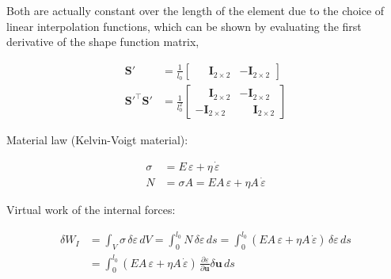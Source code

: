 Both are actually constant over the length of the element due to the choice of linear interpolation functions, which can be shown by evaluating the first derivative of the shape function matrix,

\begin{align}
\boldsymbol{S}' &= \frac{1}{l_{0}}
\begin{bmatrix}
\phantom{-}\boldsymbol{I}_{2 \times 2} & -\boldsymbol{I}_{2 \times 2}
\end{bmatrix} \\
\boldsymbol{S}'^\intercal\boldsymbol{S}' &= \frac{1}{l_{0}^2}
\begin{bmatrix}
\phantom{-}\boldsymbol{I}_{2 \times 2} & -\boldsymbol{I}_{2 \times 2} \\
-\boldsymbol{I}_{2 \times 2} & \phantom{-}\boldsymbol{I}_{2 \times 2}
\end{bmatrix}
\end{align}






Material law (Kelvin-Voigt material):

\begin{align}
\sigma &= E\,\varepsilon + \eta\,\dot{\varepsilon} \\
N &= \sigma A = EA\,\varepsilon + \eta A\,\dot{\varepsilon}
\end{align}

Virtual work of the internal forces:

\begin{align}
\delta W_{I} &= \int_{V} \sigma\,\delta\varepsilon\,dV = \int_{0}^{l_{0}} N\,\delta\varepsilon\,ds = \int_{0}^{l_{0}} \left( EA\,\varepsilon + \eta A\,\dot{\varepsilon} \right)\,\delta\varepsilon\,ds \\
&= \int_{0}^{l_{0}} \left( EA\,\varepsilon + \eta A\,\dot{\varepsilon} \right)\,\frac{\partial \varepsilon}{\partial \boldsymbol{u}}\delta\boldsymbol{u}\,ds
\end{align}

